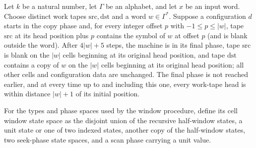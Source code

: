 \begin{theorem}
\label{Turing.rt_moveWord_run}
\leanok
{}
Let $k$ be a natural number, let $\Gamma$ be an alphabet, and let $x$ be an input word.
Choose distinct work tapes $\mathrm{src},\mathrm{dst}$ and a word $w\in\Gamma^*$.
Suppose a configuration $d$ starts in the copy phase and, for every integer offset $p$
with $-1\le p\le |w|$, tape $\mathrm{src}$ at its head position plus $p$ contains the
symbol of $w$ at offset $p$ (and is blank outside the word). After $4|w|+5$ steps, the
machine is in its final phase, tape $\mathrm{src}$ is blank on the $|w|$ cells beginning
at its original head position, and tape $\mathrm{dst}$ contains a copy of $w$ on the
$|w|$ cells beginning at its original head position; all other cells and configuration
data are unchanged. The final phase is not reached earlier, and at every time up to and
including this one, every work-tape head is within distance $|w|+1$ of its initial
position.
\end{theorem}

\begin{definition}
\label{Turing.rt_cellWindowState}
\leanok
{}
For the types and phase spaces used by the window procedure, define its cell window
state space as the disjoint union of the recursive half-window states, a unit state or
one of two indexed states, another copy of the half-window states, two seek-phase state
spaces, and a scan phase carrying a unit value.
\end{definition}

